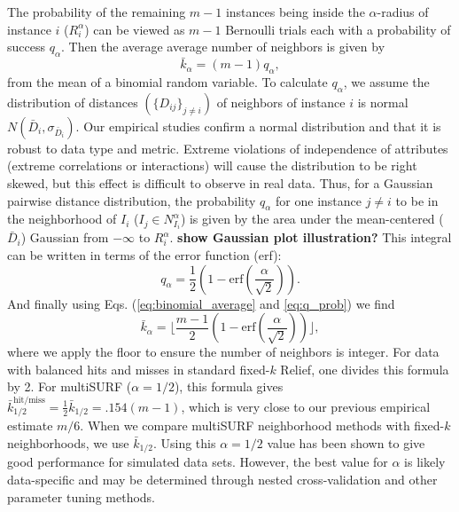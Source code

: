 \documentclass[10pt]{article}
\begin{document}
The probability of the remaining $m-1$ instances being inside the $\alpha$-radius of instance $i$ ($R_i^{\alpha}$) can be viewed as $m-1$ Bernoulli trials each with a probability of success $q_{\alpha}$. Then the average average number of neighbors is given by
\begin{equation}
\label{eq:binomial_average}
  {\bar{k}}_{\alpha} = (m-1)q_{\alpha},
\end{equation}
from the mean of a binomial random variable. To calculate $q_{\alpha}$, we assume the distribution of distances $(\{D_{ij} \}_{j \ne i})$ of neighbors of instance $i$ is normal $N(\bar{D}_i,\sigma_{\bar{D}_i})$. Our empirical studies confirm a normal distribution and that it is robust to data type and metric. Extreme violations of independence of attributes (extreme correlations or interactions) will cause the distribution to be right skewed, but this effect is difficult to observe in real data. Thus, for a Gaussian pairwise distance distribution, the probability $q_{\alpha}$ for one instance $j \ne i$ to be in the neighborhood of $I_i$ ($I_j \in N^{\alpha}_{I_i}$) is given by the area under the mean-centered ($\bar{D}_i$) Gaussian from $-\infty$ to $R_i^{\alpha}$. {\bf show Gaussian plot illustration?} This integral can be written in terms of the error function (erf):
\begin{equation}
\label{eq:q_prob}
q_{\alpha} = \frac{1}{2} \left( 1 - \mathrm{erf}\left( \frac{\alpha}{\sqrt{2}} \right) \right).
\end{equation}
And finally using Eqs. (\ref{eq:binomial_average} and \ref{eq:q_prob}) we find
\begin{equation}\label{eq:kbar}
{\bar{k}}_{\alpha} = \lfloor \frac{m-1}{2}  \left( 1 - \mathrm{erf}\left( \frac{\alpha}{\sqrt{2}} \right) \right) \rfloor,
\end{equation}
where we apply the floor to ensure the number of neighbors is integer. For data with balanced hits and misses in standard fixed-$k$ Relief, one divides this formula by 2. For multiSURF ($\alpha=1/2$), this formula gives $\bar{k}_{1/2}^{\text{hit/miss}} = \frac{1}{2}\bar{k}_{1/2} = .154 (m-1)$, which is very close to our previous empirical estimate $m/6$. When we compare multiSURF neighborhood methods with fixed-$k$ neighborhoods, we use $\bar{k}_{1/2}$. Using this $\alpha=1/2$ value has been shown to give good performance for simulated data sets. However, the best value for $\alpha$ is likely data-specific and may be determined through nested cross-validation and other parameter tuning methods. 
\end{document}
